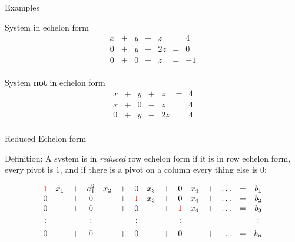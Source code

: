\documentclass{beamer}
\begin{document}
\begin{frame}{Examples}
  \begin{exampleblock}{System in echelon form}
    \[\begin{array}{ccccccc}
    x & + & y & + & z  & = & 4\\
    0 & + & y & + & 2z & = & 0\\
    0 & + & 0 & + & z  & = & -1\\    
    \end{array}\]
  \end{exampleblock}

  \begin{exampleblock}{System {\bf not} in echelon form}
    \[\begin{array}{ccccccc}
    x & + & y & + & z  & = & 4\\
    x & + & 0 & - & z & = & 4\\
    0 & + & y & - & 2z& = & 4\\    
    \end{array}\]
  \end{exampleblock}
\end{frame}

\begin{frame}{Reduced Echelon form}
  
  
  \begin{block}{Definition:}
    A system is in \emph{reduced} row echelon form if it is in row echelon form, every pivot is $1$, and if there is a pivot on a column every thing else is $0$:

    \[ \begin{array}{ccccccccccccccc}
      {\color{red}1}      & x_1 & + & a^2_1       & x_2 & + & 0       & x_3 & + & 0       & x_4 & + & \dots & = & b_1 \\
      0     &      & + & 0           &      & + & {\color{red}1} & x_3 & + & 0       & x_4 & + & \dots & = & b_2\\
      0     &     & + & 0          &      & + & 0           &     & + & {\color{red}1} & x_4 & + & \dots & = & b_3\\
      \vdots&     &   & \vdots     &     &   & \vdots      &     &   & \vdots     &     &   &       &   & \vdots\\
      0     &     & + & 0          &     & + & 0           &     & + & 0          &     & + & \dots & = & b_n\\
    \end{array}
    \]
    
    
  \end{block}
\end{frame}
\end{document}
